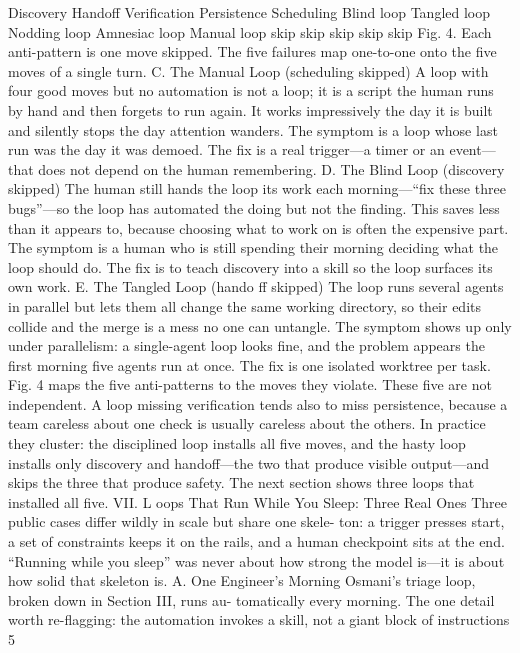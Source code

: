 \documentclass[conference]{IEEEtran}
\begin{document}
Discovery
Handoff
Verification
Persistence
Scheduling
Blind loop
Tangled loop
Nodding loop
Amnesiac loop
Manual loop
skip
skip
skip
skip
skip
Fig. 4. Each anti-pattern is one move skipped. The five failures map
one-to-one onto the five moves of a single turn.
C. The Manual Loop (scheduling skipped)
A loop with four good moves but no automation is not a loop;
it is a script the human runs by hand and then forgets to run
again. It works impressively the day it is built and silently stops
the day attention wanders. The symptom is a loop whose last
run was the day it was demoed. The fix is a real trigger—a timer
or an event—that does not depend on the human remembering.
D. The Blind Loop (discovery skipped)
The human still hands the loop its work each morning—“fix
these three bugs”—so the loop has automated the doing but not
the finding. This saves less than it appears to, because choosing
what to work on is often the expensive part. The symptom is
a human who is still spending their morning deciding what the
loop should do. The fix is to teach discovery into a skill so the
loop surfaces its own work.
E. The Tangled Loop (hando ff skipped)
The loop runs several agents in parallel but lets them all
change the same working directory, so their edits collide and
the merge is a mess no one can untangle. The symptom shows
up only under parallelism: a single-agent loop looks fine, and
the problem appears the first morning five agents run at once.
The fix is one isolated worktree per task. Fig. 4 maps the five
anti-patterns to the moves they violate.
These five are not independent. A loop missing verification
tends also to miss persistence, because a team careless about
one check is usually careless about the others. In practice they
cluster: the disciplined loop installs all five moves, and the hasty
loop installs only discovery and handoff—the two that produce
visible output—and skips the three that produce safety. The next
section shows three loops that installed all five.
VII. L oops That Run While You Sleep: Three Real Ones
Three public cases differ wildly in scale but share one skele-
ton: a trigger presses start, a set of constraints keeps it on the
rails, and a human checkpoint sits at the end. “Running while
you sleep” was never about how strong the model is—it is about
how solid that skeleton is.
A. One Engineer’s Morning
Osmani’s triage loop, broken down in Section III, runs au-
tomatically every morning. The one detail worth re-flagging:
the automation invokes a skill, not a giant block of instructions
5
\end{document}
